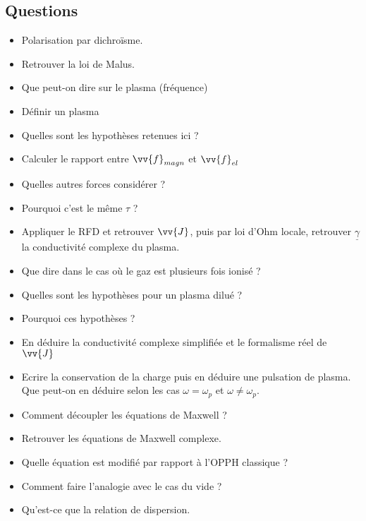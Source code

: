 \documentclass[a4paper, 11pt, hidelinks]{article}
\begin{document}
\subsection{Questions}



\begin{itemize}
    \item Polarisation par dichroïsme. \cite{Chapitre15}
    \item Retrouver la loi de Malus. \cite{Chapitre15}
    \item Que peut-on dire sur le plasma (fréquence) \cite{Chapitre16}
    \item Définir un plasma \cite{Chapitre16}
    \item Quelles sont les hypothèses retenues ici ? \cite{Chapitre16}
    \item Calculer le rapport entre $\vv{f}_{magn}$ et $\vv{f}_{el}$ \cite{Chapitre16}
    \item Quelles autres forces considérer ? \cite{Chapitre16}
    \item Pourquoi c'est le même $\tau$ ? \cite{Chapitre16}
    \item Appliquer le RFD et retrouver $\vv{J}$, puis par loi d'Ohm locale, retrouver $\underline{\gamma}$ la conductivité complexe du plasma. \cite{Chapitre16}
    \item Que dire dans le cas où le gaz est plusieurs fois ionisé ? \cite{Chapitre16}
    \item Quelles sont les hypothèses pour un plasma dilué ? \cite{Chapitre16}
    \item Pourquoi ces hypothèses ? \cite{Chapitre16}
    \item En déduire la conductivité complexe simplifiée et le formalisme réel de $\vv{J}$ \cite{Chapitre16}
    \item Ecrire la conservation de la charge puis en déduire une pulsation de plasma. Que peut-on en déduire selon les cas $\omega=\omega_p$ et $\omega\neq \omega_p$. \cite{Chapitre16}
    \item Comment découpler les équations de Maxwell ? \cite{Chapitre16}
    \item Retrouver les équations de Maxwell complexe. \cite{Chapitre16}
    \item Quelle équation est modifié par rapport à l'OPPH classique ? \cite{Chapitre16}
    \item Comment faire l'analogie avec le cas du vide ? \cite{Chapitre16}
    \item Qu'est-ce que la relation de dispersion. \cite{Chapitre16}

\end{itemize}
\end{document}
